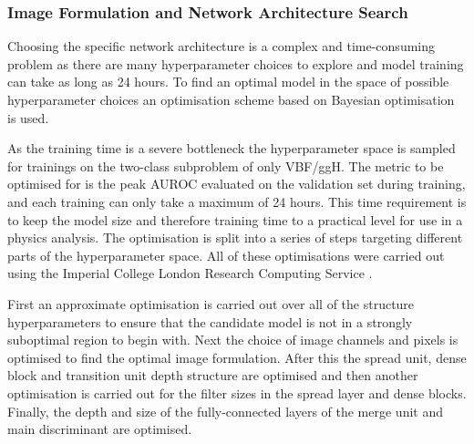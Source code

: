\subsubsection{Image Formulation and Network Architecture Search}
Choosing the specific network architecture is a complex and time-consuming problem as there are many hyperparameter choices to explore and model training can take as long as 24 hours.
To find an optimal model in the space of possible hyperparameter choices an optimisation scheme based on Bayesian optimisation is used. 


As the training time is a severe bottleneck the hyperparameter space is sampled for trainings on the two-class subproblem of only VBF/ggH. 
The metric to be optimised for is the peak AUROC evaluated on the validation set during training, and each training can only take a maximum of 24 hours. 
This time requirement is to keep the model size and therefore training time to a practical level for use in a physics analysis.  
The optimisation is split into a series of steps targeting different parts of the hyperparameter space.
All of these optimisations were carried out using the Imperial College London Research Computing Service \cite{IC_HPC}.

First an approximate optimisation is carried out over all of the structure hyperparameters to ensure that the candidate model is not in a strongly suboptimal region to begin with. 
Next the choice of image channels and pixels is optimised to find the optimal image formulation. After this the spread unit, dense block and transition unit depth structure are optimised and then another optimisation is carried out for the filter sizes in the spread layer and dense blocks. Finally, the depth and size of the fully-connected layers of the merge unit and main discriminant are optimised. 

